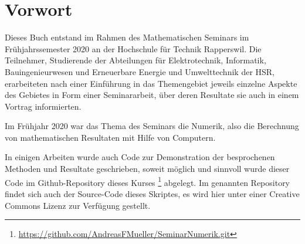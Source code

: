 %
%
%
\chapter*{Vorwort}
\rhead{}
Dieses Buch entstand im Rahmen des Mathematischen Seminars
im Frühjahrssemester 2020 an der Hochschule für Technik Rapperswil.
Die Teilnehmer, Studierende der Abteilungen für Elektrotechnik,
Informatik, Bauingenieurwesen und Erneuerbare Energie und Umwelttechnik
der HSR, erarbeiteten nach einer Einführung in das Themengebiet jeweils
einzelne Aspekte des Gebietes in Form einer Seminararbeit, über
deren Resultate sie auch in einem Vortrag informierten. 

Im Frühjahr 2020 war das Thema des Seminars die Numerik, also die
%
Berechnung von mathematischen Resultaten mit Hilfe von Computern.

In einigen Arbeiten wurde auch Code zur Demonstration der 
besprochenen Methoden und Resultate geschrieben, soweit
möglich und sinnvoll wurde dieser Code im Github-Repository
dieses Kurses%
\footnote{\url{https://github.com/AndreasFMueller/SeminarNumerik.git}}
\cite{buch:repo}
abgelegt.
Im genannten Repository findet sich auch der Source-Code dieses
Skriptes, es wird hier unter einer Creative Commons Lizenz
zur Verfügung gestellt.






